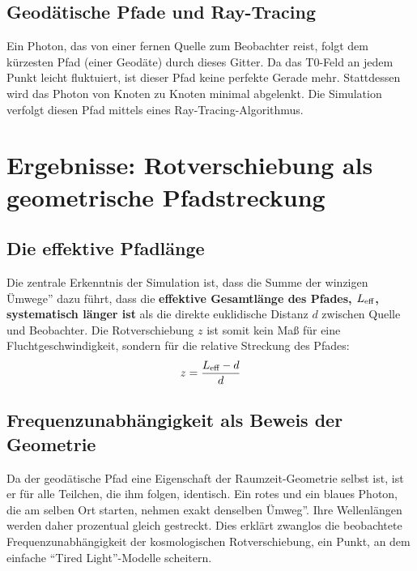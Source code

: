 \documentclass[12pt,a4paper]{article}
\begin{document}
	\subsection{Geodätische Pfade und Ray-Tracing}
	Ein Photon, das von einer fernen Quelle zum Beobachter reist, folgt dem kürzesten Pfad (einer Geodäte) durch dieses Gitter. Da das T0-Feld an jedem Punkt leicht fluktuiert, ist dieser Pfad keine perfekte Gerade mehr. Stattdessen wird das Photon von Knoten zu Knoten minimal abgelenkt. Die Simulation verfolgt diesen Pfad mittels eines Ray-Tracing-Algorithmus.
	\section{Ergebnisse: Rotverschiebung als geometrische Pfadstreckung}
	\subsection{Die effektive Pfadlänge}
	Die zentrale Erkenntnis der Simulation ist, dass die Summe der winzigen Ümwege'' dazu führt, dass die \textbf{effektive Gesamtlänge des Pfades, $L_{\text{eff}}$, systematisch länger ist} als die direkte euklidische Distanz $d$ zwischen Quelle und Beobachter.
	Die Rotverschiebung $z$ ist somit kein Maß{} für eine Fluchtgeschwindigkeit, sondern für die relative Streckung des Pfades:
	\begin{equation}
		z = \frac{L_{\text{eff}} - d}{d}
	\end{equation}
	\subsection{Frequenzunabhängigkeit als Beweis der Geometrie}
	Da der geodätische Pfad eine Eigenschaft der Raumzeit-Geometrie selbst ist, ist er für alle Teilchen, die ihm folgen, identisch. Ein rotes und ein blaues Photon, die am selben Ort starten, nehmen exakt denselben Ümweg''. Ihre Wellenlängen werden daher prozentual gleich gestreckt. Dies erklärt zwanglos die beobachtete Frequenzunabhängigkeit der kosmologischen Rotverschiebung, ein Punkt, an dem einfache ``Tired Light''-Modelle scheitern.
\end{document}
